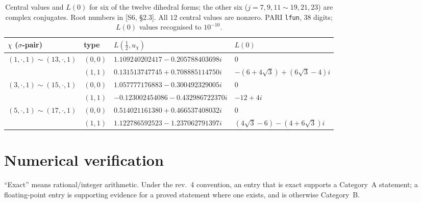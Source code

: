 \documentclass[11pt]{article}
\theoremstyle{definition}
\newcommand{\src}[1]{\textup{[S#1]}}
\begin{document}
\begin{table}[ht]\centering\small
\begin{tabular}{llll}\toprule
$\chi$ ($\sigma$-pair) & type & $L(\tfrac12,u_\chi)$ & $L(0)$\\\midrule
$(1,\cdot,1)\sim(13,\cdot,1)$ & $(0,0)$ & $1.109240202417-0.205788403698i$ & $0$\\
 & $(1,1)$ & $0.131513747745+0.708885114750i$ & $-(6+4\sqrt3)+(6\sqrt3-4)i$\\
$(3,\cdot,1)\sim(15,\cdot,1)$ & $(0,0)$ & $1.057777176883-0.300492329005i$ & $0$\\
 & $(1,1)$ & $-0.123002454086-0.432986722370i$ & $-12+4i$\\
$(5,\cdot,1)\sim(17,\cdot,1)$ & $(0,0)$ & $0.514021161380+0.466537408032i$ & $0$\\
 & $(1,1)$ & $1.122786592523-1.237062791397i$ & $(4\sqrt3-6)-(4+6\sqrt3)i$\\\bottomrule
\end{tabular}
\caption{Central values and $L(0)$ for six of the twelve dihedral forms; the other six ($j=7,9,11\sim19,21,23$) are complex conjugates. Root numbers in
\src{6, \S2.3}. All $12$ central values are nonzero. PARI \texttt{lfun}, 38 digits; $L(0)$ values recognised to $10^{-10}$.}\label{tab:L}
\end{table}

\section{Numerical verification}\label{sec:num}
``Exact'' means rational/integer arithmetic. Under the rev.~4 convention, an entry that is exact supports a Category~A statement; a floating-point entry
is supporting evidence for a proved statement where one exists, and is otherwise Category~B.
\end{document}
